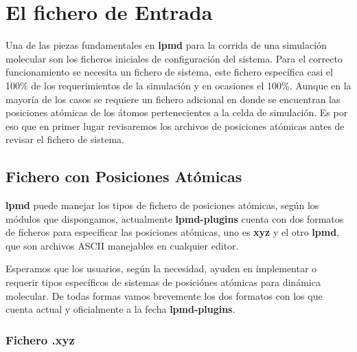 \documentclass[a4paper,10pt]{scrbook}
\newcommand{\lpmd}{\textbf{lpmd }}
\begin{document}
\chapter{El fichero de Entrada}
\label{chap:input}

Una de las piezas fundamentales en \lpmd para la corrida de una simulaci\'on molecular son los ficheros iniciales de configuraci\'on del sistema. Para el correcto funcionamiento se necesita un fichero de sistema, este fichero espec\'ifica casi el 100\% de los requerimientos de la simulaci\'on y en ocasiones el 100\%. Aunque en la mayor\'ia de los casos se requiere un fichero adicional en donde se encuentran las posiciones at\'omicas de los \'atomos pertenecientes a la celda de simulaci\'on. Es por eso que en primer lugar revisaremos los archivos de posiciones at\'omicas antes de revisar el fichero de sistema.

\section{Fichero con Posiciones At\'omicas}

\lpmd puede manejar los tipos de fichero de posiciones at\'omicas, seg\'un los m\'odulos que dispongamos, actualmente \textbf{lpmd-plugins} cuenta con dos formatos de ficheros para especificar las posiciones at\'omicas, uno es \textbf{xyz} y el otro \textbf{lpmd}, que son archivos ASCII manejables en cualquier editor.

Esperamos que los usuarios, seg\'un la necesidad, ayuden en implementar o requerir tipos espec\'ificos de sistemas de posici\'ones at\'omicas para din\'amica molecular. De todas formas vamos brevemente los dos formatos con los que cuenta actual y oficialmente a la fecha \textbf{lpmd-plugins}.

\subsection{Fichero .xyz}
\end{document}
